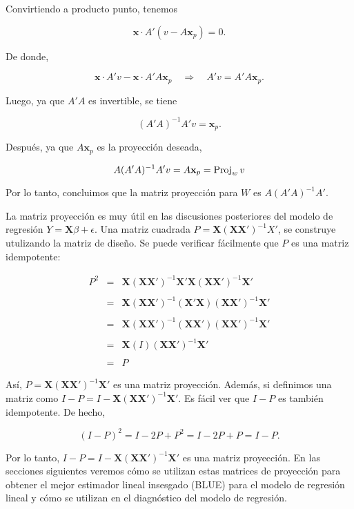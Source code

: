 \begin{teo}
	Convirtiendo a producto punto, tenemos

	$$\textbf{x}\cdot A'(v-A\textbf{x}_p)=0.$$

	De donde,

	$$\textbf{x}\cdot A'v-\textbf{x}\cdot A'A\textbf{x}_p \quad \Rightarrow \quad A'v=A'A\textbf{x}_p.$$

	Luego, ya que $A'A$ es invertible, se tiene

	$$(A'A)^{-1}A'v = \textbf{x}_p.$$

	Después, ya que $A\textbf{x}_p$ es la proyección deseada,

	$$A(A'A)^{-1}A'v=A\textbf{x}_p=\mathop{\mbox{\normalfont Proj}}\nolimits_w v$$

	Por lo tanto, concluimos que la matriz proyección para $W$ es $A(A'A)^{-1}A'.$
\end{teo}

La matriz proyección es muy útil en las discusiones posteriores del modelo de regresión $Y=\textbf{X}\beta+\epsilon$. Una matriz cuadrada $P=\textbf{X}(\textbf{X}\textbf{X}')^{-1}X'$, se construye utulizando la matriz de diseño. Se puede verificar fácilmente que $P$ es una matriz idempotente:

$$
\begin{array}{rcl}
    P^2&=&\textbf{X}(\textbf{X}\textbf{X}')^{-1}\textbf{X}'\textbf{X}(\textbf{X}\textbf{X}')^{-1}\textbf{X}'\\\\
       &=&\textbf{X}(\textbf{X}\textbf{X}')^{-1}(\textbf{X}'\textbf{X})(\textbf{X}\textbf{X}')^{-1}\textbf{X}'\\\\
       &=&\textbf{X}(\textbf{X}\textbf{X}')^{-1}(\textbf{X}\textbf{X}')(\textbf{X}\textbf{X}')^{-1}\textbf{X}'\\\\
       &=& \textbf{X}(I)(\textbf{XX}')^{-1}\textbf{X}'\\\\
       &=&P
\end{array}
$$

Así, $P=\textbf{X}(\textbf{X}\textbf{X}')^{-1}\textbf{X}'$ es una matriz proyección. Además, si definimos una matriz como $I-P=I-\textbf{X}(\textbf{X}\textbf{X}')^{-1}\textbf{X}'$. Es fácil ver que $I-P$ es también idempotente. De hecho,

$$(I-P)^2=I-2P+P^2=I-2P+P=I-P.$$

Por lo tanto, $I-P=I-\textbf{X}(\textbf{X}\textbf{X}')^{-1}\textbf{X}'$ es una matriz proyección. En las secciones siguientes veremos cómo se utilizan estas matrices de proyección para obtener el mejor estimador lineal insesgado (BLUE) para el modelo de regresión lineal y cómo se utilizan en el diagnóstico del modelo de regresión.


